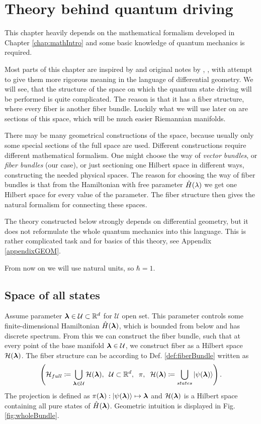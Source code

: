\chapter{Theory behind quantum driving}
\label{chap:driving}
This chapter heavily depends on the mathematical formalism developed in Chapter \ref{chap:mathIntro} and some basic knowledge of quantum mechanics is required.

Most parts of this chapter are inspired by \citet{kolodrubez} and original notes by \citet{berry1984}, \citet{berry1989}, \citet{berry2009} with attempt to give them more rigorous meaning in the language of differential geometry. We will see, that the structure of the space on which the quantum state driving will be performed is quite complicated. The reason is that it has a fiber structure, where every fiber is another fiber bundle. Luckily what we will use later on are sections of this space, which will be much easier Riemannian manifolds. 

There may be many geometrical constructions of the space, because usually only some special sections of the full space are used. Different constructions require different mathematical formalism. One might choose the way of \emph{vector bundles}, or \emph{fiber bundles} (our case), or just sectioning one Hilbert space in different ways, constructing the needed physical spaces. The reason for choosing the way of fiber bundles is that from the Hamiltonian with free parameter $\hat{H}(\lambda)$ we get one Hilbert space for every value of the parameter. The fiber structure then gives the natural formalism for connecting these spaces.

The theory constructed below strongly depends on differential geometry, but it does not reformulate the whole quantum mechanics into this language. This is rather complicated task and for basics of this theory, see Appendix \ref{appendixGEOM}.

From now on we will use natural units, so $\hbar=1$.

\section{Space of all states}
Assume parameter ${\bm\lambda}\in\mathcal{U}\subset\mathbb{R}^d$ for $\mathcal U$ open set. This parameter controls some finite-dimensional Hamiltonian $\hat{H}({\bm\lambda})$, which is bounded from below and has discrete spectrum. From this we can construct the fiber bundle, such that at every point of the base manifold ${\bm\lambda}\in \mathcal{U}$, we construct fiber as a Hilbert space $\mathcal{H}({\bm\lambda})$. The fiber structure can be according to Def. \ref{def:fiberBundle} written as
$$\left(\mathcal{H}_{full}\coloneqq \bigcup_{{\bm\lambda}\in\mathcal U} \mathcal{H}({\bm\lambda}),\;\;\mathcal{U}\subset \mathbb{R}^d,\;\;\pi,\;\; \mathcal{H}({\bm\lambda}) \coloneqq \bigcup_{states}\ket{\psi({\bm\lambda})}  \right).$$
The projection is defined as $\pi({\bm\lambda}): \ket{\psi({\bm\lambda})}\mapsto {\bm\lambda}$ and $\mathcal{H}({\bm\lambda})$ is a Hilbert space containing all pure states of $\hat{H}({\bm\lambda})$.  Geometric intuition is displayed in Fig. \ref{fig:wholeBundle}.

